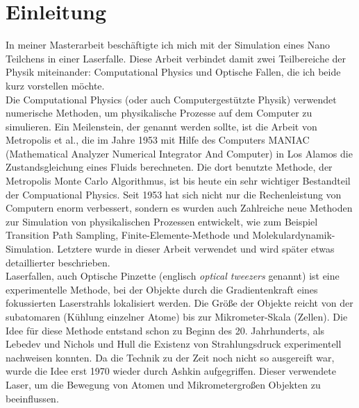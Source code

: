 \documentclass[12pt]{article}
\begin{document}
\section{Einleitung}
In meiner Masterarbeit beschäftigte ich mich mit der Simulation eines Nano Teilchens in einer Laserfalle. Diese Arbeit verbindet damit 
zwei Teilbereiche der Physik miteinander: Computational Physics und Optische Fallen, die ich beide kurz vorstellen möchte.\\
Die Computational Physics (oder auch Computergestützte Physik) verwendet numerische Methoden, um physikalische Prozesse auf dem Computer
zu simulieren. Ein Meilenstein, der genannt werden sollte, ist die Arbeit von Metropolis et al., die im Jahre 1953 mit Hilfe des Computers
MANIAC (Mathematical Analyzer Numerical Integrator And Computer) in Los Alamos die Zustandsgleichung eines Fluids berechneten. Die dort 
benutzte Methode, der Metropolis Monte Carlo Algorithmus, ist bis heute ein sehr wichtiger Bestandteil der Compuational Physics. Seit
1953 hat sich nicht nur die Rechenleistung von Computern enorm verbessert, sondern es wurden auch Zahlreiche neue Methoden zur Simulation 
von physikalischen Prozessen entwickelt, wie zum Beispiel Transition Path Sampling, Finite-Elemente-Methode und Molekulardynamik-Simulation. 
Letztere wurde in dieser Arbeit verwendet und wird später etwas detaillierter beschrieben.\\
Laserfallen, auch Optische Pinzette (englisch \textit{optical tweezers} genannt) ist eine experimentelle Methode, bei der Objekte durch die 
Gradientenkraft eines fokussierten Laserstrahls lokalisiert werden. Die Größe der Objekte reicht von der subatomaren (Kühlung einzelner Atome) bis zur
Mikrometer-Skala (Zellen). Die Idee für diese Methode entstand schon zu Beginn des 20. Jahrhunderts, als Lebedev und Nichols und Hull die 
Existenz von Strahlungsdruck experimentell nachweisen konnten. Da die Technik zu der Zeit noch nicht so ausgereift war, wurde die Idee erst 
1970 wieder durch Ashkin aufgegriffen. Dieser verwendete Laser, um die Bewegung von Atomen und Mikrometergroßen Objekten zu beeinflussen.\\
\end{document}
